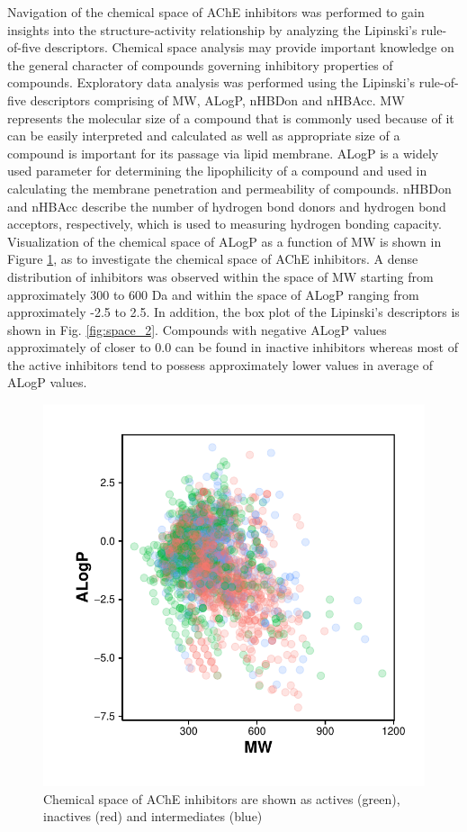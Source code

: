 \documentclass[fleqn,10pt]{wlpeerj}
\begin{document}
Navigation of the chemical space of AChE inhibitors was performed to gain insights into the structure-activity relationship by analyzing the Lipinski's rule-of-five descriptors. Chemical space analysis may provide important knowledge on the general character of compounds governing inhibitory properties of compounds. Exploratory data analysis was performed using the Lipinski's rule-of-five descriptors comprising of MW, ALogP, nHBDon and nHBAcc. MW represents the molecular size of a compound that is commonly used because of it can be easily interpreted and calculated as well as appropriate size of a compound is important for its passage via lipid membrane. ALogP is a widely used parameter for determining the lipophilicity of a compound and used in calculating the membrane penetration and permeability of compounds. nHBDon and nHBAcc describe the number of hydrogen bond donors and hydrogen bond acceptors, respectively, which is used to measuring hydrogen bonding capacity. Visualization of the chemical space of ALogP as a function of MW is shown in Figure \ref{fig:space_1}, as to investigate the chemical space of AChE inhibitors. A dense distribution of inhibitors was observed within the space of MW starting from approximately 300 to 600 Da and within the space of ALogP ranging from approximately -2.5 to 2.5. In addition, the box plot of the Lipinski's descriptors is shown in Fig. \ref{fig:space_2}. Compounds with negative ALogP values approximately of closer to 0.0 can be found in inactive inhibitors whereas most of the active inhibitors tend to possess approximately lower values in average of ALogP values.

\begin{figure}[!hb]
\centering
\includegraphics[width = 0.7 \linewidth]{Fig_MW_vs_ALogP_Review}
\caption{Chemical space of AChE inhibitors are shown as actives (green), inactives (red) and intermediates (blue)} 
\label{fig:space_1} 
\end{figure}
\end{document}
